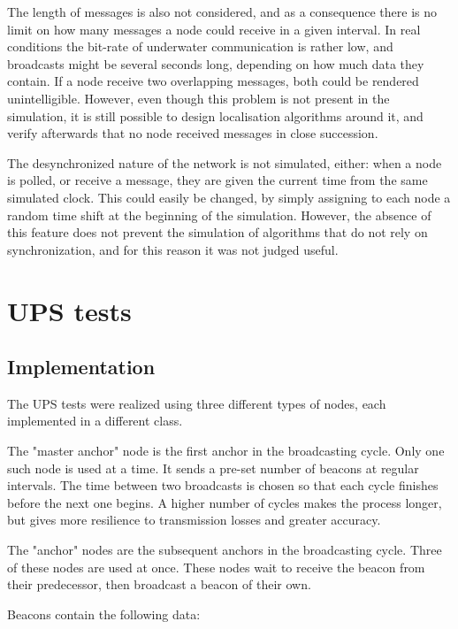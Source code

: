 \documentclass[12pt,a4paper,fleqn]{report}
\begin{document}
The length of messages is also not considered, and as a consequence there is no limit on how many messages a node could receive in a given interval. In real conditions the bit-rate of underwater communication is rather low, and broadcasts might be several seconds long, depending on how much data they contain. If a node receive two overlapping messages, both could be rendered unintelligible. However, even though this problem is not present in the simulation, it is still possible to design localisation algorithms around it, and verify afterwards that no node received messages in close succession.

The desynchronized nature of the network is not simulated, either: when a node is polled, or receive a message, they are given the current time from the same simulated clock. This could easily be changed, by simply assigning to each node a random time shift at the beginning of the simulation. However, the absence of this feature does not prevent the simulation of algorithms that do not rely on synchronization, and for this reason it was not judged useful.

\section{UPS tests}

\subsection{Implementation}

The UPS tests were realized using three different types of nodes, each implemented in a different class.

The "master anchor" node is the first anchor in the broadcasting cycle. Only one such node is used at a time. It sends a pre-set number of beacons at regular intervals. The time between two broadcasts is chosen so that each cycle finishes before the next one begins. A higher number of cycles makes the process longer, but gives more resilience to transmission losses and greater accuracy.

The "anchor" nodes are the subsequent anchors in the broadcasting cycle. Three of these nodes are used at once. These nodes wait to receive the beacon from their predecessor, then broadcast a beacon of their own.

Beacons contain the following data:
\end{document}
